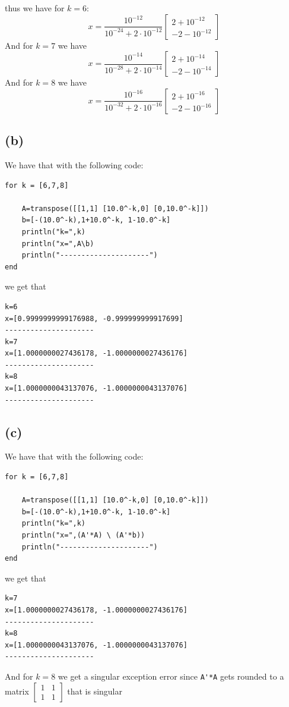 thus we have for $k=6$:
$$x=\frac{10^{-12}}{10^{-24}+2\cdot10^{-12}}\begin{bmatrix}
    2+10^{-12}\\
    -2-10^{-12}
\end{bmatrix}$$
And for $k=7$ we have
$$x=\frac{10^{-14}}{10^{-28}+2\cdot10^{-14}}\begin{bmatrix}
    2+10^{-14}\\
    -2-10^{-14}
\end{bmatrix}$$
And for $k=8$ we have
$$x=\frac{10^{-16}}{10^{-32}+2\cdot10^{-16}}\begin{bmatrix}
    2+10^{-16}\\
    -2-10^{-16}
\end{bmatrix}$$
\subsection*{(b)}
We have that with the following code:
\begin{lstlisting}
for k = [6,7,8]

    A=transpose([[1,1] [10.0^-k,0] [0,10.0^-k]])
    b=[-(10.0^-k),1+10.0^-k, 1-10.0^-k]
    println("k=",k)
    println("x=",A\b)
    println("---------------------")
end
\end{lstlisting}
we get that 
\begin{verbatim}
k=6     
x=[0.9999999999176988, -0.999999999917699]
---------------------
k=7
x=[1.0000000027436178, -1.0000000027436176]
---------------------
k=8
x=[1.0000000043137076, -1.0000000043137076]
---------------------
\end{verbatim}
\subsection*{(c)}
We have that with the following code:
\begin{lstlisting}
for k = [6,7,8]

    A=transpose([[1,1] [10.0^-k,0] [0,10.0^-k]])
    b=[-(10.0^-k),1+10.0^-k, 1-10.0^-k]
    println("k=",k)
    println("x=",(A'*A) \ (A'*b))
    println("---------------------")
end
\end{lstlisting}
we get that
\begin{verbatim}
k=7
x=[1.0000000027436178, -1.0000000027436176]
---------------------
k=8
x=[1.0000000043137076, -1.0000000043137076]
---------------------
\end{verbatim}
And for $k=8$ we get a singular exception error since \verb +A'*A+ 
gets rounded to a matrix $\begin{bmatrix}
    1 & 1\\
    1 & 1
\end{bmatrix}$ that is singular

